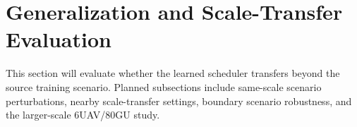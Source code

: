\section{Generalization and Scale-Transfer Evaluation}

This section will evaluate whether the learned scheduler transfers beyond the
source training scenario. Planned subsections include same-scale scenario
perturbations, nearby scale-transfer settings, boundary scenario robustness,
and the larger-scale 6UAV/80GU study.
